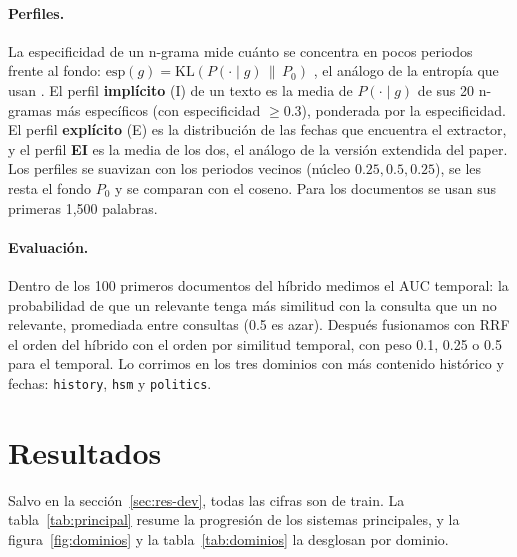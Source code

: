 \documentclass[11pt,a4paper]{article}
\begin{document}
\paragraph{Perfiles.} La especificidad de un n-grama mide cuánto se concentra en pocos periodos frente al fondo: $\mathrm{esp}(g) = \mathrm{KL}\!\left(P(\cdot \mid g)\,\|\,P_0\right)$ \citep{kullback1951information}, el análogo de la entropía que usan \citet{jatowt2013focus}. El perfil \textbf{implícito} (I) de un texto es la media de $P(\cdot \mid g)$ de sus 20 n-gramas más específicos (con especificidad $\geq 0.3$), ponderada por la especificidad. El perfil \textbf{explícito} (E) es la distribución de las fechas que encuentra el extractor, y el perfil \textbf{EI} es la media de los dos, el análogo de la versión extendida del paper. Los perfiles se suavizan con los periodos vecinos (núcleo $0.25, 0.5, 0.25$), se les resta el fondo $P_0$ y se comparan con el coseno. Para los documentos se usan sus primeras 1,500 palabras.

\paragraph{Evaluación.} Dentro de los 100 primeros documentos del híbrido medimos el AUC temporal: la probabilidad de que un relevante tenga más similitud con la consulta que un no relevante, promediada entre consultas (0.5 es azar). Después fusionamos con RRF el orden del híbrido con el orden por similitud temporal, con peso 0.1, 0.25 o 0.5 para el temporal. Lo corrimos en los tres dominios con más contenido histórico y fechas: \texttt{history}, \texttt{hsm} y \texttt{politics}.

\section{Resultados}
\label{sec:resultados}

Salvo en la sección~\ref{sec:res-dev}, todas las cifras son de train. La tabla~\ref{tab:principal} resume la progresión de los sistemas principales, y la figura~\ref{fig:dominios} y la tabla~\ref{tab:dominios} la desglosan por dominio.
\end{document}
